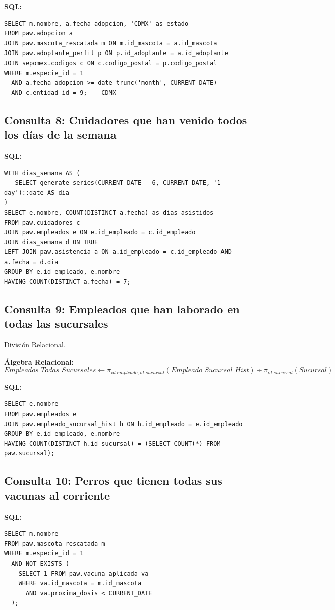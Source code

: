 \documentclass[12pt,a4paper]{article}
\begin{document}
\textbf{SQL:}
\begin{lstlisting}
SELECT m.nombre, a.fecha_adopcion, 'CDMX' as estado
FROM paw.adopcion a
JOIN paw.mascota_rescatada m ON m.id_mascota = a.id_mascota
JOIN paw.adoptante_perfil p ON p.id_adoptante = a.id_adoptante
JOIN sepomex.codigos c ON c.codigo_postal = p.codigo_postal
WHERE m.especie_id = 1
  AND a.fecha_adopcion >= date_trunc('month', CURRENT_DATE)
  AND c.entidad_id = 9; -- CDMX
\end{lstlisting}

\subsection*{Consulta 8: Cuidadores que han venido todos los días de la semana}

\textbf{SQL:}
\begin{lstlisting}
WITH dias_semana AS (
   SELECT generate_series(CURRENT_DATE - 6, CURRENT_DATE, '1 day')::date AS dia
)
SELECT e.nombre, COUNT(DISTINCT a.fecha) as dias_asistidos
FROM paw.cuidadores c
JOIN paw.empleados e ON e.id_empleado = c.id_empleado
JOIN dias_semana d ON TRUE
LEFT JOIN paw.asistencia a ON a.id_empleado = c.id_empleado AND a.fecha = d.dia
GROUP BY e.id_empleado, e.nombre
HAVING COUNT(DISTINCT a.fecha) = 7;
\end{lstlisting}

\subsection*{Consulta 9: Empleados que han laborado en todas las sucursales}
División Relacional.

\textbf{Álgebra Relacional:}
\[
Empleados\_Todas\_Sucursales \leftarrow \pi_{id\_empleado, id\_sucursal}(Empleado\_Sucursal\_Hist) \div \pi_{id\_sucursal}(Sucursal)
\]

\textbf{SQL:}
\begin{lstlisting}
SELECT e.nombre
FROM paw.empleados e
JOIN paw.empleado_sucursal_hist h ON h.id_empleado = e.id_empleado
GROUP BY e.id_empleado, e.nombre
HAVING COUNT(DISTINCT h.id_sucursal) = (SELECT COUNT(*) FROM paw.sucursal);
\end{lstlisting}

\subsection*{Consulta 10: Perros que tienen todas sus vacunas al corriente}

\textbf{SQL:}
\begin{lstlisting}
SELECT m.nombre
FROM paw.mascota_rescatada m
WHERE m.especie_id = 1
  AND NOT EXISTS (
    SELECT 1 FROM paw.vacuna_aplicada va
    WHERE va.id_mascota = m.id_mascota
      AND va.proxima_dosis < CURRENT_DATE
  );
\end{lstlisting}
\end{document}
